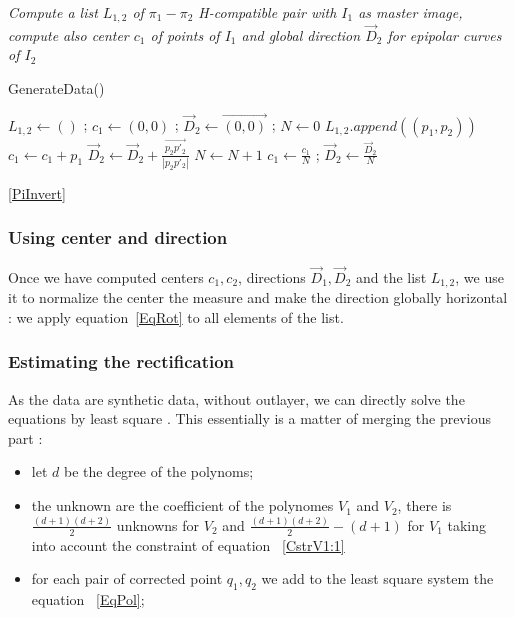 \documentclass{ipol}
\newcommand{\PiVert}{\widetilde{\pi}}
\begin{document}
\begin{algorithm}
\emph{Compute a list $L_{1,2}$  of   $\pi_1-\pi_2$ H-compatible pair with $I_1$ as master image,
  compute also center $c_1$ of points of $I_1$  and global direction $\vec{D}_2$ for epipolar curves of $I_2$}
\caption{GenerateData()}
\begin{algorithmic}
    \STATE $L_{1,2}\gets () $ ;  $c_1 \gets (0,0)$  ;   $\vec{D}_2 \gets  \overrightarrow{(0,0)}$ ; $N \gets 0 $
                  \STATE {$p_2 = \pi_2(\PiVert^{-1}_1(p_1,Z))$}
                  \STATE {$p'_2 = \pi_2(\PiVert^{-1}_1(p_1,Z+\delta_{z}))$}
                       \STATE $L_{1,2}.append((p_1,p_2))$  
                       \STATE $c_1 \gets c_1 + p_1$
                       \STATE $\vec{D}_2 \gets  \vec{D}_2 + \frac{\overrightarrow{p_2 p'_2}}{|p_2 p'_2|}$
                       \STATE $N \gets  N +1 $
                  \ENDIF
             \ENDFOR
        \ENDFOR
    \ENDFOR
    $c_1 \gets \frac{c_1}{N}$  ; $\vec{D}_2 \gets \frac{\vec{D}_2}{N} $
\end{algorithmic}
\label{AlgoGenData}
\end{algorithm}

\ref{PiInvert}


\subsubsection{Using center and direction}

Once we have computed centers $c_1,c_2$, directions   $\vec{D}_1,\vec{D}_2$  and the list $L_{1,2}$,
we use it  to normalize the center the measure and make the direction globally
horizontal : we apply equation~\ref{EqRot}  to all elements of the list.


\subsubsection{Estimating the rectification}

As the data are synthetic data, without outlayer, we can directly solve
the equations by least square . This essentially is
a matter of merging the previous part :

\begin{itemize}
    \item let $d$ be the degree of the polynoms;
    \item the unknown are the coefficient of the polynomes $V_1$ and $V_2$, there is
          $\frac{(d+1)(d+2)}{2}$ unknowns for $V_2$ and $\frac{(d+1)(d+2)}{2}-(d+1) $  for $V_1$
          taking into account the  constraint of equation ~\ref{CstrV1:1}
     \item for each pair of corrected point $q_1,q_2$ we add to the least square system
          the equation ~\ref{EqPol};
\end{itemize}
\end{document}
